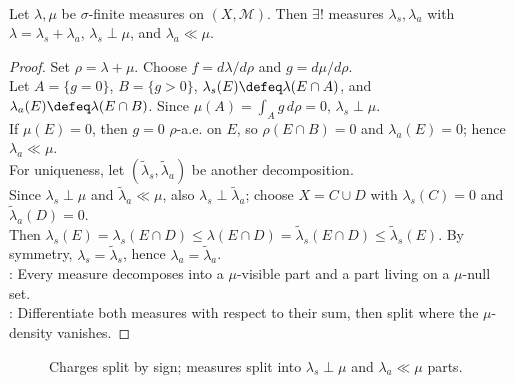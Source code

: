 \begin{theorem} \label{thm:lebesgue-decomposition-measures} \\
Let $\lambda,\mu$ be $\sigma$-finite measures on $(X,\mathcal{M})$. Then $\exists!$ measures $\lambda_s,\lambda_a$ with $\lambda=\lambda_s+\lambda_a$, $\lambda_s\perp\mu$, and $\lambda_a\ll\mu$.
\begin{proof}
Set $\rho=\lambda+\mu$. Choose $f=d\lambda/d\rho$ and $g=d\mu/d\rho$.\\
Let $A=\{g=0\}$, $B=\{g>0\}$, $\lambda_s(E)\defeq\lambda(E\cap A)$, and $\lambda_a(E)\defeq\lambda(E\cap B)$. Since $\mu(A)=\int_Ag\,d\rho=0$, $\lambda_s\perp\mu$.\\
If $\mu(E)=0$, then $g=0$ $\rho$-a.e. on $E$, so $\rho(E\cap B)=0$ and $\lambda_a(E)=0$; hence $\lambda_a\ll\mu$.\\
For uniqueness, let $(\tilde{\lambda}_s,\tilde{\lambda}_a)$ be another decomposition.\\
Since $\lambda_s\perp\mu$ and $\tilde{\lambda}_a\ll\mu$, also $\lambda_s\perp\tilde{\lambda}_a$; choose $X=C\cup D$ with $\lambda_s(C)=0$ and $\tilde{\lambda}_a(D)=0$.\\
Then $\lambda_s(E)=\lambda_s(E\cap D)\leq\lambda(E\cap D)=\tilde{\lambda}_s(E\cap D)\leq\tilde{\lambda}_s(E)$. By symmetry, $\lambda_s=\tilde{\lambda}_s$, hence $\lambda_a=\tilde{\lambda}_a$.\\
: Every measure decomposes into a $\mu$-visible part and a part living on a $\mu$-null set.\\
: Differentiate both measures with respect to their sum, then split where the $\mu$-density vanishes.
\end{proof}
\end{theorem}

\begin{figure}[H]
  \centering
  
  \caption{Charges split by sign; measures split into $\lambda_s\perp\mu$ and $\lambda_a\ll\mu$ parts.}
  \label{fig:measure-decomposition-schematic}
\end{figure}

